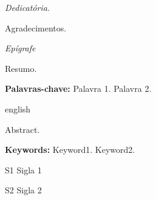 \documentclass[
	12pt,				%
	openright,			%
	oneside,			%
	a4paper,			%
	english,			%
	french,				%
	spanish,			%
	brazil				%
	]{abntex2}
\begin{document}
\begin{dedicatoria}
	\vspace*{\fill}
	\centering
	\noindent
	\textit{ Dedicatória.} \vspace*{\fill}
\end{dedicatoria}

\begin{agradecimentos}
	
	Agradecimentos.
	
\end{agradecimentos}

\begin{epigrafe}
	\vspace*{\fill}
	\begin{flushright}
		\textit{Epígrafe}
	\end{flushright}
\end{epigrafe}


\setlength{\absparsep}{18pt} %
\begin{resumo}
	
	Resumo.
	
	\textbf{Palavras-chave:} Palavra 1. Palavra 2.
\end{resumo}

\begin{resumo}[Abstract]
	\begin{otherlanguage*}{english}
		 
		Abstract.
		
		\textbf{Keywords:} Keyword1. Keyword2. 
		
	\end{otherlanguage*}
\end{resumo}

\listoffigures*
\cleardoublepage

\listoftables*
\cleardoublepage

\begin{siglas}
	\item[S1] Sigla 1
	\item[S2] Sigla 2
	
\end{siglas}
\end{document}
